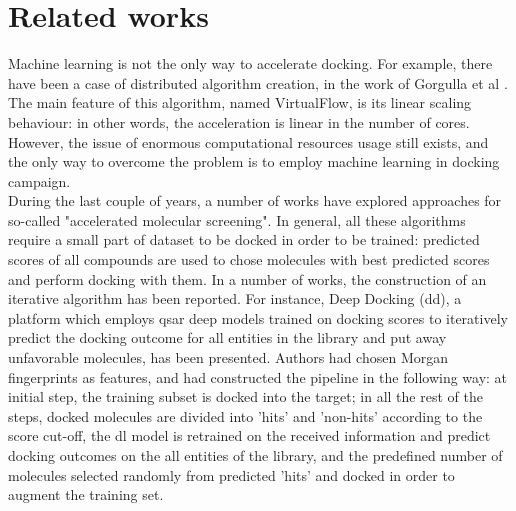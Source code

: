 \section{Related works}

Machine learning is not the only way to accelerate docking.
For example, there have been a case of distributed algorithm creation, in the work of Gorgulla et al {\cite{Gorgulla2020AnScreens}}. 
The main feature of this algorithm, named VirtualFlow, is its linear scaling behaviour: in other words, the acceleration is linear in the number of cores.
However, the issue of enormous computational resources usage still exists, and the only way to overcome the problem is to employ machine learning in docking campaign.\\
 
During the last couple of years, a number of works have explored approaches for so-called "accelerated molecular screening".
In general, all these algorithms require a small part of dataset to be docked in order to be trained: predicted scores of all compounds are used to chose molecules with best predicted scores and perform docking with them.
In a number of works, the construction of an iterative algorithm has been reported.
For instance, Deep Docking {\cite{Gentile2020DeepDiscovery}} (\acrshort{dd}), a platform which employs \acrshort{qsar} deep models trained on docking scores to iteratively predict the docking outcome for all entities in the library and put away unfavorable molecules, has been presented.
Authors had chosen Morgan fingerprints as features, and had constructed the pipeline in the following way: at initial step, the training subset is docked into the target; in all the rest of the steps, docked molecules are divided into 'hits' and 'non-hits' according to the score cut-off, the \acrshort{dl} model is retrained on the received information and predict docking outcomes on the all entities of the library, and the predefined number of molecules selected randomly from predicted 'hits' and docked in order to augment the training set.\\

